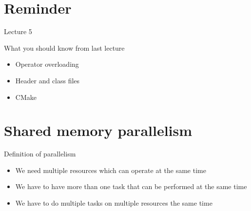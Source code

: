 \documentclass[12pt,t]{beamer}
\title{\coursename}
\subtitle{Lecture 6: Shared memory  parallelism}
\date {
 \tiny \url{\courseurl}
\vspace{2cm}
\doclicenseThis  
  
}
\begin{document}
 {
    \frame {
        \titlepage
    }
}

\frame{

\tableofcontents

}


\section{Reminder}
\begin{frame}{Lecture 5}
\begin{block}{What you should know from last lecture}
\begin{itemize}
\item Operator overloading
\item Header and class files
\item CMake
\end{itemize}
\end{block}
\end{frame}

\section{Shared memory parallelism}

\begin{frame}{Definition of parallelism}

\begin{itemize}
\item We need multiple resources which can operate at the same time
\item We have to have more than one task that can be performed at the same time
\item We have to do multiple tasks on multiple resources the same time
\end{itemize}

\end{frame}
\end{document}
